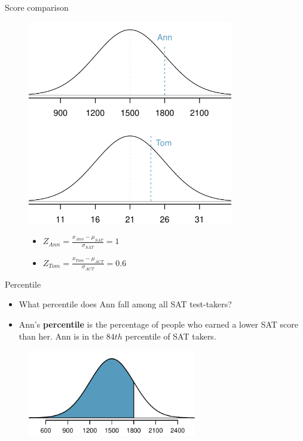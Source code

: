\documentclass[12pt,a4paper]{beamer}
\begin{document}
\begin{frame}{Score comparison}
	
	\begin{figure}
	 	\centering
		\begin{minipage}{.5\textwidth}
		  \centering
	\includegraphics[width=0.8\textwidth]{figures/satActNormals/satActNormals}
	\end{minipage}%
	\begin{minipage}{0.7\textwidth}
	  \small \begin{itemize}
	 \item $Z_{Ann} = \frac{x_{Ann} - \mu_{SAT}}{\sigma_{SAT}}= 1$

	\vspace{2cm}
	\item $Z_{Tom} = \frac{x_{Tom} - \mu_{ACT}}{\sigma_{ACT}} = 0.6$
\end{itemize}
\end{minipage}
	\end{figure}
\end{frame}
\begin{frame}{Percentile}
	\begin{itemize}
		\item What percentile does Ann fall  among all 
		SAT test-takers? 
		\item Ann’s \textbf{percentile} is the percentage of people who earned a lower SAT score than her. Ann is in the $84th$ percentile of SAT takers.
	\end{itemize}
		\begin{figure}[htb]
		   \centering
		   \includegraphics[height=1.5in]{figures/satBelow1800/satBelow1800}
		   
		\end{figure}
\end{frame}
\end{document}
